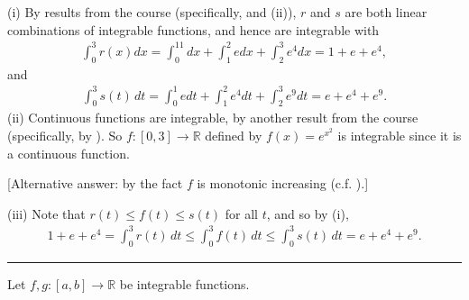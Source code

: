 \documentclass[letterpaper,10pt,english]{jupyterBook}
\begin{document}
\sphinxAtStartPar
{\hyperref[\detokenize{Problems:id69}]{}}
(i) By results from the course (specifically,  and (ii)), \(r\) and \(s\) are both linear combinations of integrable functions, and hence are integrable with
\begin{equation*}
\begin{split}
\int_0^3 r(x) dx = \int_0^11dx+\int_1^2edx+\int_2^3e^4dx = 1+e+e^4,
\end{split}
\end{equation*}
\sphinxAtStartPar
and
\begin{equation*}
\begin{split}
\int_0^3 s(t)\, dt = \int_0^1edt+\int_1^2e^4dt+\int_2^3e^9dt = e+e^4+e^9.
\end{split}
\end{equation*}
\sphinxAtStartPar
(ii) Continuous functions are integrable, by another result from the course (specifically, by ). So \(f\colon [0,3]\rightarrow \mathbb{R}\) defined by \(f(x)=e^{x^2}\) is integrable since it is a continuous function.

\sphinxAtStartPar
{[}Alternative answer: by the fact \(f\) is monotonic increasing (c.f. ).{]}

\sphinxAtStartPar
(iii) Note that \(r(t)\leq f(t)\leq s(t)\) for all \(t\), and so by (i),
\begin{equation*}
\begin{split}
1+e+e^4  = \int_0^3 r(t)\, dt \leq \int_0^3 f(t)\, dt \leq \int_0^3 s(t)\, dt = e+e^4+e^9.
\end{split}
\end{equation*}

\bigskip\hrule\bigskip


\sphinxAtStartPar
{\hyperref[\detokenize{Problems:id70}]{}} Let \(f,g:[a,b]\to\mathbb{R}\) be integrable functions.
\end{document}
